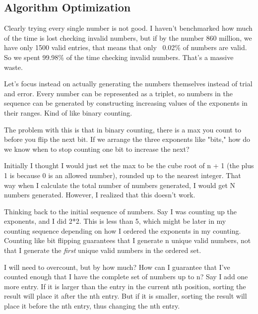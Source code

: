 \documentclass{article}
\begin{document}
\newpage

\subsection{Algorithm Optimization}

Clearly trying every single number is not good. I haven't benchmarked how much of the time is lost checking invalid numbers, but if by the number 860 million, we have only 1500 valid entries, that means that only ~0.02\% of numbers are valid. So we spent 99.98\% of the time checking invalid numbers. That's a massive waste. \newline

Let's focus instead on actually generating the numbers themselves instead of trial and error. Every number can be represented as a triplet, so numbers in the sequence can be generated by constructing increasing values of the exponents in their ranges. Kind of like binary counting. \newline

The problem with this is that in binary counting, there is a max you count to before you flip the next bit. If we arrange the three exponents like "bits," how do we know when to stop counting one bit to increase the next? \newline

Initially I thought I would just set the max to be the cube root of n + 1 (the plus 1 is because 0 is an allowed number), rounded up to the nearest integer. That way when I calculate the total number of numbers generated, I would get N numbers generated. However, I realized that this doesn't work. \newline

Thinking back to the initial sequence of numbers. Say I was counting up the exponents, and I did 2*2. This is less than 5, which might be later in my counting sequence depending on how I ordered the exponents in my counting. Counting like bit flipping guarantees that I generate n unique valid numbers, not that I generate the \textit{first} unique valid numbers in the ordered set. \newline

I will need to overcount, but by how much? How can I guarantee that I've counted enough that I have the complete set of numbers up to n? Say I add one more entry. If it is larger than the entry in the current nth position, sorting the result will place it after the nth entry. But if it is smaller, sorting the result will place it before the nth entry, thus changing the nth entry. \newline
\end{document}
